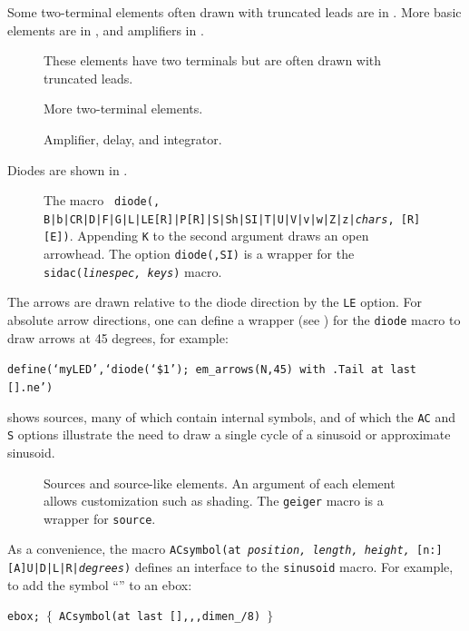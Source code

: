 Some two-terminal elements often drawn with truncated leads are in
.
More basic elements are in , and amplifiers in .
\begin{figure}[H]
   
   \caption{These elements have two terminals but are often drawn
     with truncated leads.}
   \label{heaterMan}
    \end{figure}
\begin{figure}[H]
   
   \caption{More two-terminal elements.}
   \label{MoreTable}
    \end{figure}
\begin{figure}[H]
\vspace*{-\baselineskip}
   
   \caption{Amplifier, delay, and integrator.}
   \label{AmpTable}
   \end{figure}

\pagebreak
Diodes are shown in .
\begin{figure}[H]
   
   \caption{The macro {\tt
     diode(\linespec, B|b|CR|D|F|G|L|LE[R]|P[R]|S|Sh|SI|T|U|V|v|w|Z|z|{\sl chars}, [R][E])}.
      Appending {\tt K} to the second argument draws an open arrowhead.
      The option {\tt diode(,SI)} is a wrapper for the
      {\tt sidac({\sl linespec, keys})} macro.}
   \label{Diodes}
   \end{figure}
The arrows are drawn relative to the diode direction by the {\tt LE}
option. For absolute arrow directions, one can
define a wrapper (see ) for the {\tt diode} macro to draw arrows
at 45 degrees, for example:
\par
{\tt define(`myLED',`diode(`\$1'); em\_arrows(N,45)
 with .Tail at last [].ne')}

\enlargethispage{\baselineskip}
 shows sources, many of which contain internal symbols,
and of which the {\tt AC} and {\tt S} options illustrate the need
to draw a single cycle of a sinusoid or approximate sinusoid.
\begin{figure}[hbt]
   
   \caption{Sources and source-like elements. An argument of each
      element allows customization such as shading. The {\tt geiger}
      macro is a wrapper for {\tt source}.}
   \label{Sources}
   \end{figure}
%
As a convenience,
the macro {\tt ACsymbol(at {\sl position, length, height,}
  [n:][A]U|D|L|R|{\sl degrees})} defines an interface to
the {\tt sinusoid} macro.  For example, to add the symbol
``\ACSymbol'' to an ebox:
\par
{\tt ebox; $\lbrace$\ ACsymbol(at last [],{,},dimen\_/8) $\rbrace$}

